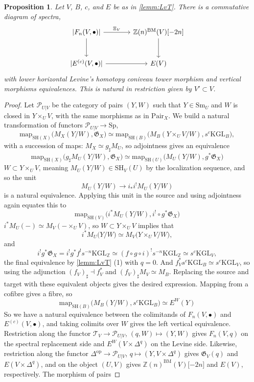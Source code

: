 \documentclass[11pt, twoside]{article}
\numberwithin{equation}{section}
\newtheorem{proposition}[equation]{Proposition}
\theoremstyle{definition}
\newcommand{\bb}[1]{\mathbb{#1}}
\newcommand{\mf}[1]{\mathfrak{#1}}
\newcommand{\map}{\mathrm{map}}
\newcommand{\Kgl}{\mathrm{KGL}}
\newcommand{\sh}{\mathrm{SH}}
\newcommand{\Sp}{\mathrm{Sp}}
\newcommand{\bm}{\mathrm{BM}}
\newcommand{\sm}{\mathrm{Sm}}
\newcommand{\op}{\mathrm{op}}
\begin{document}
\begin{proposition}\label{prop:TL}
Let \(V\), \(B\), \(c\), and \(E\) be as in \ref{lemm:LvT}. There is a commutative diagram of spectra,
\[\begin{tikzcd} [row sep = large, column sep = large]
\lvert F_n(V, \bullet) \rvert \ar[d] \ar[r, "\Xi_V"] & \bb{Z}(n)^\bm(V)\lbrack -2n \rbrack \ar[d]\\
\lvert E^{(c)}(V, \bullet)\rvert \ar[r] & E(V)
\end{tikzcd}\]
with lower horizontal Levine's homotopy coniveau tower morphism and vertical morphisms equivalences. This is natural in restriction given by \(V' \subset V\).
\end{proposition}

\begin{proof}
Let \(\mathcal{P}_{U|V}\) be the category of pairs \((Y, W)\) such that \(Y \in \sm_U\) and \(W\) is closed in \(Y \times_U V\), with the same morphisms as in \(\mathrm{Pair}_X\). We build a natural transformation of functors \(\mathcal{P}_{U|V} \to \Sp\), 
\[\map_{\sh(X)}\big(M_X(Y/W), \mf{G}_X\big) \simeq \map_{\sh(B)}\big(M_B(Y \times_U V/W), s^c \Kgl_B\big),\]
with a succession of maps: \(M_X \simeq g_\sharp M_U\), so adjointness gives an equivalence 
\[\map_{\sh(X)}\big(g_\sharp M_U(Y/W), \mf{G}_X\big) \simeq \map_{\sh(U)}\big(M_U(Y/W), g^* \mf{G}_X\big)\]
\(W \subset Y \times_U V\), meaning \(M_U(Y/W) \in \sh_V(U)\) by the localization sequence, and so the unit 
\[M_U(Y/W) \to i_*i^! M_U(Y/W)\]
is a natural equivalence. Applying this unit in the source and using adjointness again equates this to 
\[\map_{\sh(V)}\big(i^*M_U(Y/W), i^! \circ g^* \mf{G}_X\big)\]
\(i^* M_U( -) \simeq M_V( - \times_U V)\), so \(W \subset Y \times_U V\) implies that 
\[i^* M_U\big(Y/W\big) \simeq M_V\big(Y \times_U V/W\big),\]
and 
\[i^! g^*\mf{G}_X = i^! g^* f^! s^{- n} \Kgl_\bb{Z} \simeq (f \circ g \circ i)^! s^{- n} \Kgl_\bb{Z} \simeq s^c \Kgl_V,\]
the final equivalence by \ref{lemm:LvT} (1) with \(q = 0\). And \(f_V^* s^c \Kgl_B \simeq s^c \Kgl_V\), so using the adjunction \((f_V)_\sharp \dashv f_V^*\) and \((f_V)_\sharp M_V \simeq M_B\). Replacing the source and target with these equivalent objects gives the desired expression. Mapping from a cofibre gives a fibre, so 
\[\map_{\sh(B)}\big(M_B(Y/W), s^c \Kgl_B\big) \simeq E^W(Y)\]
So we have a natural equivalence between the colimitands of \(F_n(V, \bullet)\) and \(E^{(c)}(V, \bullet)\), and taking colimits over \(W\) gives the left vertical equivalence. Restriction along the functor \(\mathcal{T}_V \to \mathcal{P}_{U|V}\), \((q, W) \mapsto (Y, W)\) gives \(F_n(V, q)\) on the spectral replacement side and \(E^W(V \times \Delta^q)\) on the Levine side. Likewise, restriction along the functor \(\Delta^\op \to \mathcal{P}_{U|V}\), \(q \mapsto (Y, V \times \Delta^q)\) gives \(\mf{G}_V(q)\) and \(E(V \times \Delta^q)\), and on the object \((U, V)\) gives \(\bb{Z}(n)^\bm(V)\lbrack -2n \rbrack\) and \(E(V)\), respectively. The morphism of pairs 

\end{proof}
\end{document}
